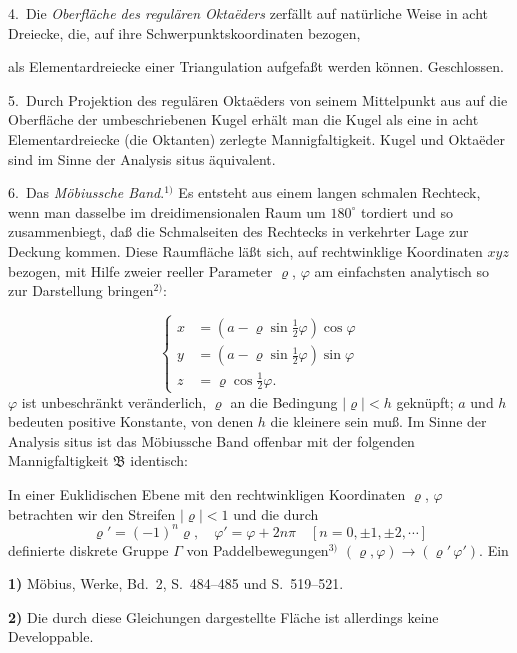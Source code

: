 \documentclass{article}
\begin{document}
4.\ Die \emph{Oberfläche des regulären Oktaëders} zerfällt auf natürliche Weise in acht Dreiecke, die, auf ihre Schwerpunktskoordinaten bezogen,

als Elementardreiecke einer Triangulation aufgefaßt werden können. Geschlossen.

5.\ Durch Projektion des regulären Oktaëders von seinem Mittelpunkt aus auf die Oberfläche der umbeschriebenen Kugel erhält man die Kugel als eine in acht Elementardreiecke (die Oktanten) zerlegte Mannigfaltigkeit. Kugel und Oktaëder sind im Sinne der Analysis situs äquivalent.


6.\ Das \emph{Möbiussche Band}.${}^{1)}$ Es entsteht aus einem langen schmalen Rechteck, wenn man dasselbe im dreidimensionalen Raum um $180^\circ$ tordiert und so zusammenbiegt, daß die Schmalseiten des Rechtecks in verkehrter Lage zur Deckung kommen. Diese Raumfläche läßt sich, auf rechtwinklige Koordinaten $xyz$ bezogen, mit Hilfe zweier reeller Parameter $\varrho$, $\varphi$ am einfachsten analytisch so zur Darstellung bringen${}^{2)}$:

\[
\left\{
\begin{aligned}
x &= (a - \varrho \sin \tfrac{1}{2}\varphi) \cos \varphi \\
y &= (a - \varrho \sin \tfrac{1}{2}\varphi) \sin \varphi \\
z &= \varrho \cos \tfrac{1}{2}\varphi.
\end{aligned}
\right.
\]
$\varphi$ ist unbeschränkt veränderlich, $\varrho$ an die Bedingung $|\varrho| < h$ geknüpft; $a$ und $h$ bedeuten positive Konstante, von denen $h$ die kleinere sein muß. Im Sinne der Analysis situs ist das Möbiussche Band offenbar mit der folgenden Mannigfaltigkeit $\mathfrak{B}$ identisch:

In einer Euklidischen Ebene mit den rechtwinkligen Koordinaten $\varrho$, $\varphi$ betrachten wir den Streifen $|\varrho| < 1$ und die durch
\[
\varrho' = (-1)^n \varrho, \quad \varphi' = \varphi + 2n\pi \quad [n = 0, \pm 1, \pm 2, \cdots]
\]
definierte diskrete Gruppe $\varGamma$ von Paddelbewegungen${}^{3)}$ $(\varrho, \varphi) \to (\varrho'\,\varphi')$. Ein

\textbf{1)} Möbius, Werke, Bd.\ 2, S.\ 484--485 und S.\ 519--521.

\textbf{2)} Die durch diese Gleichungen dargestellte Fläche ist allerdings keine Developpable.
\end{document}
